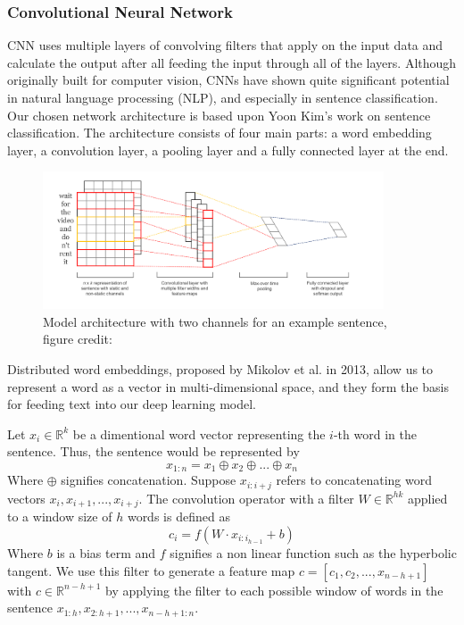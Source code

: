 \documentclass[conference]{IEEEtran}
\begin{document}
\subsubsection{Convolutional Neural Network}
\label{model:core:cnn}
    CNN uses multiple layers of convolving filters that apply on the input data and
    calculate the output after all feeding the input through all of the layers. Although
    originally built for computer vision, CNNs have shown quite significant potential in
    natural language processing (NLP), and especially in sentence classification.
    Our chosen network architecture is based upon Yoon Kim's work on sentence
    classification\cite{kim2014convolutional}. The architecture consists of four 
    main parts: a word
    embedding layer, a convolution layer, a pooling layer and a fully connected layer
    at the end.
    \begin{figure}
    \center\includegraphics[width=0.9\textwidth]{figure/sc_model}
    \caption{Model architecture with two channels for an example sentence,
     figure credit: \cite{kim2014convolutional}}
    \end{figure}

    Distributed word embeddings, proposed by Mikolov et al.
    in 2013\cite{word2vec}, allow us to represent a word as a vector in
    multi-dimensional space, and they form the basis for feeding text into our deep
    learning model.

    Let $x_{i} \in \mathbb{R}^k$ be a dimentional word vector representing the $i$-th word in the
    sentence. Thus, the sentence would be represented by
    \begin{equation}
    x_{1:n} = x_1 \oplus x_2 \oplus ... \oplus x_n
    \end{equation}
    Where $\oplus$ signifies concatenation. Suppose $x_{i:i+j}$ refers to concatenating
    word vectors $x_i, x_{i+1}, ... , x_{i+j}$. The convolution operator with a filter
    $W \in \mathbb{R}^{hk}$ applied to a window size of $h$
    words is defined as
    \begin{equation}
    c_i = f(W \cdot x_{i:i_{h-1}} + b)
    \end{equation}
    Where $b$ is a bias term and $f$ signifies a non linear function such as the hyperbolic
    tangent. We use this filter to generate a feature map $c = [c_1, c_2, ... ,x_{n-h+1}]$
    with $c \in \mathbb{R}^{n-h+1}$ by applying the filter to each possible window of words in
    the sentence $x_{1:h}, x_{2:h+1}, ... ,x_{n-h+1:n}$.
\end{document}
